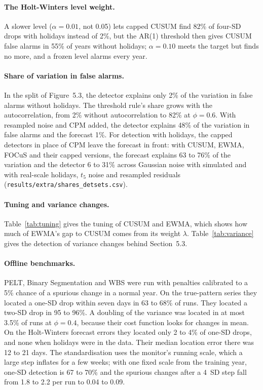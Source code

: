 \paragraph{The Holt-Winters level weight.} A slower level ($\alpha=0.01$, not 0.05) lets capped CUSUM find 82\% of four-SD drops with holidays instead of 2\%, but the AR(1) threshold then gives CUSUM false alarms in 55\% of years without holidays; $\alpha=0.10$ meets the target but finds no more, and a frozen level alarms every year.

\paragraph{Share of variation in false alarms.} In the split of Figure~5.3, the detector explains only 2\% of the variation in false alarms without holidays. The threshold rule's share grows with the autocorrelation, from 2\% without autocorrelation to 82\% at $\phi=0.6$. With resampled noise and CPM added, the detector explains 48\% of the variation in false alarms and the forecast 1\%. For detection with holidays, the capped detectors in place of CPM leave the forecast in front: with CUSUM, EWMA, FOCuS and their capped versions, the forecast explains 63 to 76\% of the variation and the detector 6 to 31\% across Gaussian noise with simulated and with real-scale holidays, $t_5$ noise and resampled residuals (\texttt{results/extra/shares\_detsets.csv}).

\paragraph{Tuning and variance changes.} Table~\ref{tab:tuning} gives the tuning of CUSUM and EWMA, which shows how much of EWMA's gap to CUSUM comes from its weight $\lambda$. Table~\ref{tab:variance} gives the detection of variance changes behind Section~5.3.





\paragraph{Offline benchmarks.} PELT, Binary Segmentation and WBS were run with penalties calibrated to a 5\% chance of a spurious change in a normal year. On the true-pattern series they located a one-SD drop within seven days in 63 to 68\% of runs. They located a two-SD drop in 95 to 96\%. A doubling of the variance was located in at most 3.5\% of runs at $\phi = 0.4$, because their cost function looks for changes in mean. On the Holt-Winters forecast errors they located only 2 to 4\% of one-SD drops, and none when holidays were in the data. Their median location error there was 12 to 21 days. The standardisation uses the monitor's running scale, which a large step inflates for a few weeks; with one fixed scale from the training year, one-SD detection is 67 to 70\% and the spurious changes after a 4~SD step fall from 1.8 to 2.2 per run to 0.04 to 0.09.
